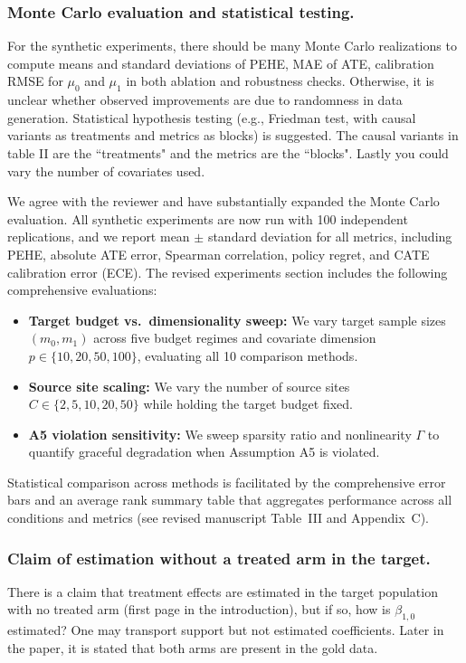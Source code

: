 \subsubsection{Monte Carlo evaluation and statistical testing.}  
For the synthetic experiments, there should be many Monte Carlo realizations to compute means and standard deviations of PEHE, MAE of ATE, calibration RMSE for $\mu_0$ and $\mu_1$ in both ablation and robustness checks. Otherwise, it is unclear whether observed improvements are due to randomness in data generation. Statistical hypothesis testing (e.g., Friedman test, with causal variants as treatments and metrics as blocks) is suggested. The causal variants in table II are the ``treatments" and the metrics are the ``blocks". Lastly you could vary the number of covariates used.\\

{\color{blue} We agree with the reviewer and have substantially expanded the Monte Carlo evaluation. All synthetic experiments are now run with 100 independent replications, and we report mean $\pm$ standard deviation for all metrics, including PEHE, absolute ATE error, Spearman correlation, policy regret, and CATE calibration error (ECE). The revised experiments section includes the following comprehensive evaluations:
\begin{itemize}
\item \textbf{Target budget vs.\ dimensionality sweep:} We vary target sample sizes $(m_0, m_1)$ across five budget regimes and covariate dimension $p \in \{10, 20, 50, 100\}$, evaluating all 10 comparison methods.
\item \textbf{Source site scaling:} We vary the number of source sites $C \in \{2, 5, 10, 20, 50\}$ while holding the target budget fixed.
\item \textbf{A5 violation sensitivity:} We sweep sparsity ratio and nonlinearity $\Gamma$ to quantify graceful degradation when Assumption A5 is violated.
\end{itemize}
Statistical comparison across methods is facilitated by the comprehensive error bars and an average rank summary table that aggregates performance across all conditions and metrics (see revised manuscript Table~III and Appendix~C).}

\subsubsection{Claim of estimation without a treated arm in the target.}  
There is a claim that treatment effects are estimated in the target population with no treated arm (first page in the introduction), but if so, how is $\beta_{1,0}$ estimated? One may transport support but not estimated coefficients. Later in the paper, it is stated that both arms are present in the gold data.

